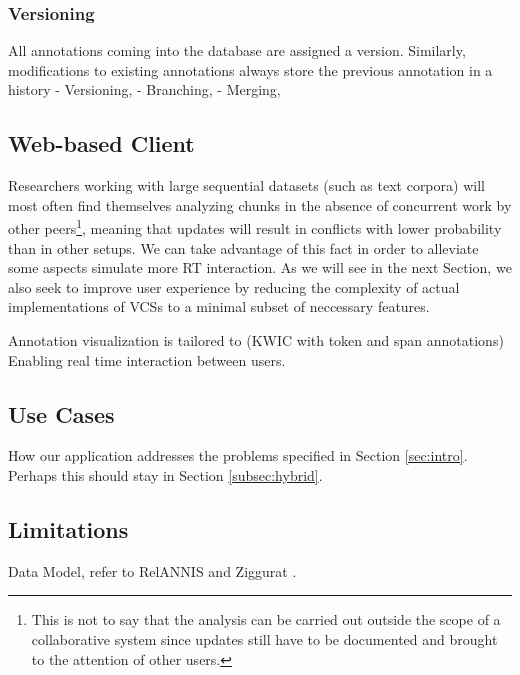 \documentclass{sig-alternate}
\begin{document}

\subsubsection{Versioning}\label{subsec:dbversion}

All annotations coming into the database are assigned a version. Similarly, modifications to
existing annotations always store the previous annotation in a history
- Versioning,
- Branching,
- Merging,

\subsection{Web-based Client}\label{subsec:client}
Researchers working with large sequential datasets (such as text corpora) will most often find
themselves analyzing chunks in the absence of concurrent work by other peers\footnote{
  This is not to say that the analysis can be carried out outside the scope of a collaborative system
  since updates still have to be documented and brought to the attention of other users.
}, meaning that updates will result in conflicts with lower probability than in other setups.
We can take advantage of this fact in order to alleviate some aspects 
simulate more RT interaction.
As we will see in the next Section, we also seek to improve user experience by reducing the
complexity of actual implementations of VCSs to a minimal subset of neccessary features.

Annotation visualization is tailored to (KWIC with token and span annotations)
Enabling real time interaction between users. 

\subsection{Use Cases}
How our application addresses the problems specified in Section \ref{sec:intro}. Perhaps this
should stay in Section \ref{subsec:hybrid}.

\subsection{Limitations}
Data Model, refer to RelANNIS and Ziggurat \cite{Krause2016,Evert2015}.
\end{document}
